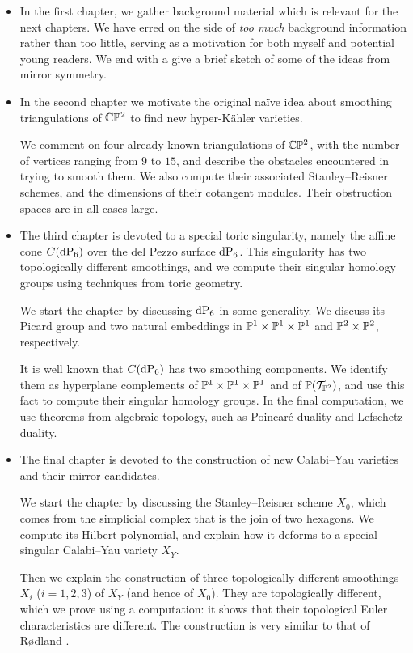 \begin{itemize}
\item In the first chapter, we gather background material which is relevant for the next chapters. We have erred on the side of \emph{too much} background information rather than too little, serving as a motivation for both myself and potential young readers. We end with a give a brief sketch of some of the ideas from mirror symmetry.

\item In the second chapter we motivate the original naïve idea about smoothing triangulations of $\C \P^2$ to find new hyper-Kähler varieties.

We comment on four already known triangulations of $\C \P^2$, with the number of vertices ranging from $9$ to $15$, and describe the obstacles encountered in trying to smooth them. We also compute their associated Stanley--Reisner schemes, and the dimensions of their cotangent modules. Their obstruction spaces are in all cases large.

\item The third chapter is devoted to a special toric singularity, namely the affine cone $C(\dP6)$ over the del Pezzo surface $\dP6$. This singularity has two topologically different smoothings, and we compute their singular homology groups using techniques from toric geometry.

We start the chapter by discussing $\dP6$ in some generality. We discuss its Picard group and two natural embeddings in $\P^1 \times \P^1 \times \P^1$ and $\P^2 \times \P^2$, respectively.

It is well known that $C(\dP6)$ has two smoothing components. We identify them as hyperplane complements of $\P^1 \times \P^1 \times \P^1$ and of $\P(\mathcal T_{\P^2})$, and use this fact to compute their singular homology groups. In the final computation, we use theorems from algebraic topology, such as Poincaré duality and Lefschetz duality. 

\item The final chapter is devoted to the construction of new Calabi--Yau varieties and their mirror candidates.

We start the chapter by discussing the Stanley--Reisner scheme $X_0$, which comes from the simplicial complex that is the join of two hexagons. We compute its Hilbert polynomial, and explain how it deforms to a special singular Calabi--Yau variety $X_Y$.

Then we explain the construction of three topologically different smoothings $X_i$ ($i=1,2,3$) of $X_Y$ (and hence of $X_0$). They are topologically different, which we prove using a \MM computation: it shows that their topological Euler characteristics are different. The construction is very similar to that of Rødland \cite{rodland_pfaffian}.


\end{itemize}
